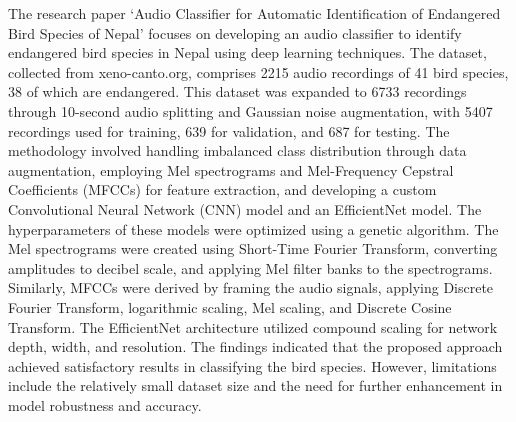 The research paper `Audio Classifier for Automatic Identification of Endangered
Bird Species of Nepal' focuses on developing an audio classifier to identify
endangered bird species in Nepal using deep learning techniques. The dataset,
collected from xeno-canto.org, comprises 2215 audio recordings of 41 bird
species, 38 of which are endangered. This dataset was expanded to 6733
recordings through 10-second audio splitting and Gaussian noise augmentation,
with 5407 recordings used for training, 639 for validation, and 687 for
testing. The methodology involved handling imbalanced class distribution
through data augmentation, employing Mel spectrograms and Mel-Frequency
Cepstral Coefficients (MFCCs) for feature extraction, and developing a custom
Convolutional Neural Network (CNN) model and an EfficientNet model. The
hyperparameters of these models were optimized using a genetic algorithm. The
Mel spectrograms were created using Short-Time Fourier Transform, converting
amplitudes to decibel scale, and applying Mel filter banks to the spectrograms.
Similarly, MFCCs were derived by framing the audio signals, applying Discrete
Fourier Transform, logarithmic scaling, Mel scaling, and Discrete Cosine
Transform. The EfficientNet architecture utilized compound scaling for network
depth, width, and resolution. The findings indicated that the proposed approach
achieved satisfactory results in classifying the bird species. However,
limitations include the relatively small dataset size and the need for further
enhancement in model robustness and accuracy. %

